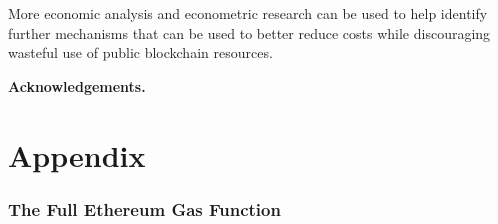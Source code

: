\documentclass[12pt, final]{article}
\begin{document}
More economic analysis and econometric research can be used to help identify further mechanisms that can be used to better reduce costs while discouraging wasteful use of public blockchain resources.

\textbf{Acknowledgements.} 





\newpage
\appendix
\part*{Appendix}











\section{The Full Ethereum Gas Function}
\label{appendix:gasfunction}
\end{document}
